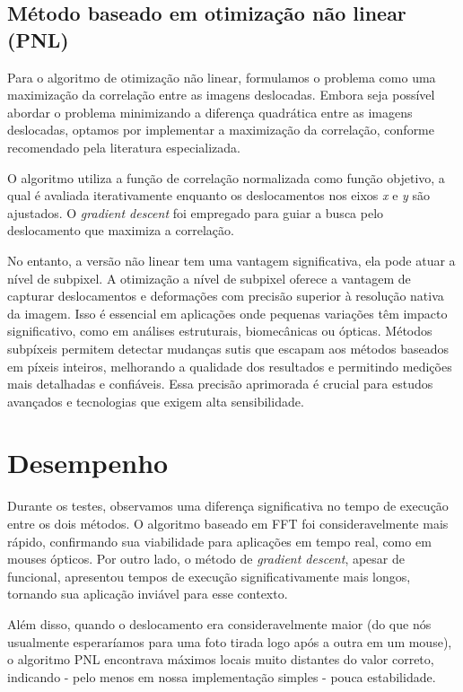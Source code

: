 \documentclass[a4paper,12pt]{article}
\begin{document}
\subsection{Método baseado em otimização não linear (PNL)}

Para o algoritmo de otimização não linear, formulamos o problema como uma maximização da correlação entre as imagens deslocadas. Embora seja possível abordar o problema minimizando a diferença quadrática entre as imagens deslocadas, optamos por implementar a maximização da correlação, conforme recomendado pela literatura especializada.

O algoritmo utiliza a função de correlação normalizada como função objetivo, a qual é avaliada iterativamente enquanto os deslocamentos nos eixos \textit{x} e \textit{y} são ajustados. O \textit{gradient descent} foi empregado para guiar a busca pelo deslocamento que maximiza a correlação.

No entanto, a versão não linear tem uma vantagem significativa, ela pode atuar a nível de subpixel. A otimização a nível de subpixel oferece a vantagem de capturar deslocamentos e deformações com precisão superior à resolução nativa da imagem. Isso é essencial em aplicações onde pequenas variações têm impacto significativo, como em análises estruturais, biomecânicas ou ópticas. Métodos subpíxeis permitem detectar mudanças sutis que escapam aos métodos baseados em píxeis inteiros, melhorando a qualidade dos resultados e permitindo medições mais detalhadas e confiáveis. Essa precisão aprimorada é crucial para estudos avançados e tecnologias que exigem alta sensibilidade.

\section{Desempenho}

Durante os testes, observamos uma diferença significativa no tempo de execução entre os dois métodos. O algoritmo baseado em FFT foi consideravelmente mais rápido, confirmando sua viabilidade para aplicações em tempo real, como em mouses ópticos. Por outro lado, o método de \textit{gradient descent}, apesar de funcional, apresentou tempos de execução significativamente mais longos, tornando sua aplicação inviável para esse contexto.

Além disso, quando o deslocamento era consideravelmente maior (do que nós usualmente esperaríamos para uma foto tirada logo após a outra em um mouse), o algoritmo PNL encontrava máximos locais
muito distantes do valor correto, indicando - pelo menos em nossa implementação simples - pouca estabilidade.
\end{document}
